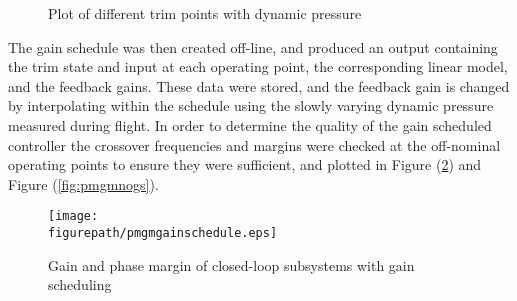 \begin{figure}[h]
  \begin{center}
    \caption{Plot of different trim points with dynamic pressure \label{fig:trimpointplot}}
  \end{center}
\end{figure}

The gain schedule was then created off-line, and produced an output containing the trim state and input at each operating point, the corresponding linear model, and the feedback gains.
These data were stored, and the feedback gain is changed by interpolating within the schedule using the slowly varying dynamic pressure measured during flight.
In order to determine the quality of the gain scheduled controller the crossover frequencies and margins were checked at the off-nominal operating points to ensure they were sufficient, and plotted in Figure (\ref{fig:pmgmgs}) and Figure (\ref{fig:pmgmnogs}).

\begin{figure}[H]
  \begin{center}
    \texttt{[image: \\figurepath/pmgmgainschedule.eps]}
    \caption{Gain and phase margin of closed-loop subsystems with gain scheduling \label{fig:pmgmgs}}
  \end{center}
\end{figure}

